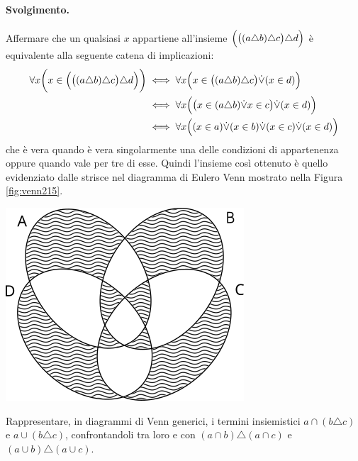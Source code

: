 \paragraph{Svolgimento.} Affermare che un qualsiasi $x$ appartiene all'insieme $\Bigl( \bigl( (a \triangle b) \triangle c \bigr) \triangle d   \Bigr)$ è equivalente alla seguente catena di implicazioni:
\begin{align*}
	\forall x \biggl( x \in \Bigl( \bigl( (a \triangle b) \triangle c \bigr) \triangle d   \Bigr) \biggr) &\iff \forall x \Bigl( x \in \bigl( (a \triangle b) \triangle c \bigr) {\displaystyle{\dot{\vee}}} (x \in d) \Bigr) \\
	&\iff \forall x \Bigl( \bigl( x \in (a \triangle b) {\displaystyle{\dot{\vee}}} x \in c  \bigr) {\displaystyle{\dot{\vee}}} (x \in d)        \Bigr) \\
	&\iff \forall x \Bigl( (x \in a) {\displaystyle{\dot{\vee}}} (x \in b) {\displaystyle{\dot{\vee}}} (x \in c) {\displaystyle{\dot{\vee}}} (x \in d)   \Bigr)
\end{align*}
che è vera quando è vera singolarmente una delle condizioni di appartenenza oppure quando vale per tre di esse. Quindi l'insieme così ottenuto è quello evidenziato dalle strisce nel diagramma di Eulero Venn mostrato nella Figura \ref{fig:venn215}.
\begin{center}
	\includegraphics[scale=0.7]{res/path9768.png}
	\label{fig:venn215}
\end{center}
\begin{exsbox}
	Rappresentare, in diagrammi di Venn generici, i termini insiemistici $a \cap (b \triangle c)$ e $a \cup (b \triangle c)$, confrontandoli tra loro e con $(a \cap b) \triangle (a \cap c)$ e $(a \cup b) \triangle (a \cup c)$.
\end{exsbox}
